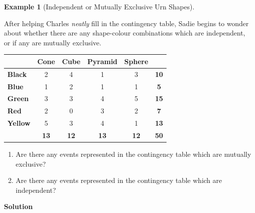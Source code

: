 \documentclass[
  letterpaper,
  DIV=11,
  numbers=noendperiod]{scrreprt}
\providecommand{\tightlist}{%
  \setlength{\itemsep}{0pt}\setlength{\parskip}{0pt}}\usepackage{longtable,booktabs,array}
\theoremstyle{definition}
\theoremstyle{definition}
\newtheorem{example}{Example}[chapter]
\theoremstyle{definition}
\theoremstyle{remark}
\begin{document}
\begin{example}[Independent or Mutually Exclusive Urn
Shapes]\protect\hypertarget{exm-contingency-table-mututally-exclusive}{}\label{exm-contingency-table-mututally-exclusive}

After helping Charles \emph{neatly} fill in the contingency table, Sadie
begins to wonder about whether there are any shape-colour combinations
which are independent, or if any are mutually exclusive.

\begin{tabular}{>{}l|c|c|c|c|>{}c}
\hline
  & Cone & Cube & Pyramid & Sphere & \\
\hline
\textbf{Black} & 2 & 4 & 1 & 3 & \textbf{10}\\
\hline
\textbf{Blue} & 1 & 2 & 1 & 1 & \textbf{5}\\
\hline
\textbf{Green} & 3 & 3 & 4 & 5 & \textbf{15}\\
\hline
\textbf{Red} & 2 & 0 & 3 & 2 & \textbf{7}\\
\hline
\textbf{Yellow} & 5 & 3 & 4 & 1 & \textbf{13}\\
\hline
\textbf{\textbf{}} & \textbf{13} & \textbf{12} & \textbf{13} & \textbf{12} & \textbf{\textbf{50}}\\
\hline
\end{tabular}

\begin{enumerate}
\def\labelenumi{\alph{enumi}.}
\tightlist
\item
  Are there any events represented in the contingency table which are
  mutually exclusive?
\item
  Are there any events represented in the contingency table which are
  independent?
\end{enumerate}

\begin{tcolorbox}[enhanced jigsaw, colback=white, colframe=quarto-callout-color-frame, arc=.35mm, leftrule=.75mm, rightrule=.15mm, opacityback=0, breakable, bottomrule=.15mm, left=2mm, toprule=.15mm]

\vspace{-3mm}\textbf{Solution}\vspace{3mm}


\end{tcolorbox}
\end{example}
\end{document}
